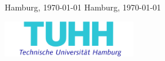 \begin{titlepage}
\begin{center}
\end{center}
\vspace{0.5cm}
\begin{center}
	{		{\large \hspace{20mm} Hamburg,
			\printdayoff \today \printdayon}}{}
	{	{\large \hspace{20mm} Hamburg, 
			\printdayoff \today \printdayon
	}}{}
	
\vspace{1cm}	
	
\centering	
\hspace{1.7cm} \includegraphics[height=45pt]{Styles/Tuhh_logo.png}

\end{center}

\end{titlepage}

\clearpage
\thispagestyle{empty}
\cleardoublepage
